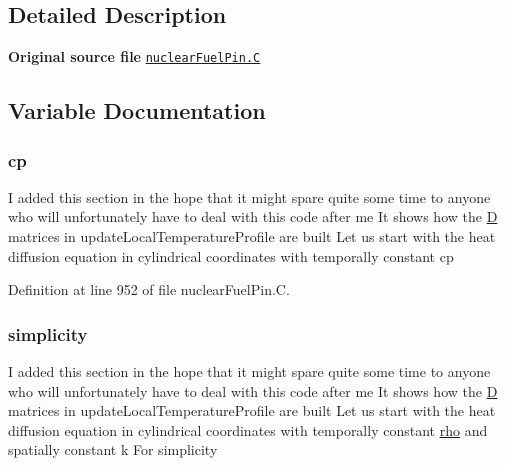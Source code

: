 \subsection{Detailed Description}
{\bfseries Original source file} \href{../../../home/carlo/data/GeN-Foam/GeN-Foam_ffn/GeN-Foam/GeN-Foam/classes/thermalHydraulics/src/phaseModels/structureModels/powerModels/nuclearFuelPin/nuclearFuelPin.C}{\tt nuclear\+Fuel\+Pin.\+C} 

\subsection{Variable Documentation}
\mbox{\label{nuclearFuelPin_8C_ae5fc70d73cd9d6fbeb7bf5456b34ef16}} 
\subsubsection{\texorpdfstring{cp}{cp}}
{\footnotesize\ttfamily I added this section in the hope that it might spare quite some time to anyone who will unfortunately have to deal with this code after me It shows how the \hyperlink{setXSFieldsSN_8H_a70ac93a527a85b4edf386830643d1561}{D} matrices in update\+Local\+Temperature\+Profile are built Let us start with the heat diffusion equation in cylindrical coordinates with temporally constant cp}



Definition at line 952 of file nuclear\+Fuel\+Pin.\+C.

\mbox{\label{nuclearFuelPin_8C_ab5364626cf5774043302fd6c7196a05f}} 
\subsubsection{\texorpdfstring{simplicity}{simplicity}}
{\footnotesize\ttfamily I added this section in the hope that it might spare quite some time to anyone who will unfortunately have to deal with this code after me It shows how the \hyperlink{setXSFieldsSN_8H_a70ac93a527a85b4edf386830643d1561}{D} matrices in update\+Local\+Temperature\+Profile are built Let us start with the heat diffusion equation in cylindrical coordinates with temporally constant \hyperlink{EEqn__1pl_8H_ac955f87ac2b79f02f420cae087fc52b1}{rho} and spatially constant k For simplicity}



